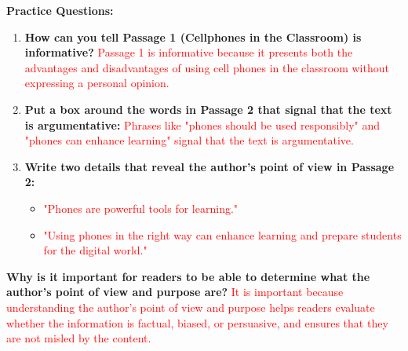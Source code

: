 \documentclass[12pt]{article}
\begin{document}
\vspace{1em}

\begin{tcolorbox}[colframe=black!60, colback=white, 
coltitle=black, colbacktitle=black!15, fonttitle=\bfseries\Large, 
title=Independent Practice, halign title=center, left=10pt, right=10pt, top=10pt, bottom=15pt]

\textbf{Practice Questions:}
\begin{enumerate}[itemsep=1em]
    \item \textbf{How can you tell Passage 1 (Cellphones in the Classroom) is informative?} 
    \textcolor{red}{Passage 1 is informative because it presents both the advantages and disadvantages of using cell phones in the classroom without expressing a personal opinion.}
    \item \textbf{Put a box around the words in Passage 2 that signal that the text is argumentative:} 
    \textcolor{red}{Phrases like "phones should be used responsibly" and "phones can enhance learning" signal that the text is argumentative.}
    \item \textbf{Write two details that reveal the author's point of view in Passage 2:} 
    \begin{itemize}
        \item \textcolor{red}{"Phones are powerful tools for learning."}
        \item \textcolor{red}{"Using phones in the right way can enhance learning and prepare students for the digital world."}
    \end{itemize}
\end{enumerate}

\end{tcolorbox}

\vspace{1em}

\begin{tcolorbox}[colframe=black!60, colback=white, 
coltitle=black, colbacktitle=black!15, fonttitle=\bfseries\Large, 
title=Exit Ticket, halign title=center, left=10pt, right=10pt, top=10pt, bottom=15pt]

\textbf{Why is it important for readers to be able to determine what the author's point of view and purpose are?} 
\textcolor{red}{It is important because understanding the author's point of view and purpose helps readers evaluate whether the information is factual, biased, or persuasive, and ensures that they are not misled by the content.}

\end{tcolorbox}
\end{document}
